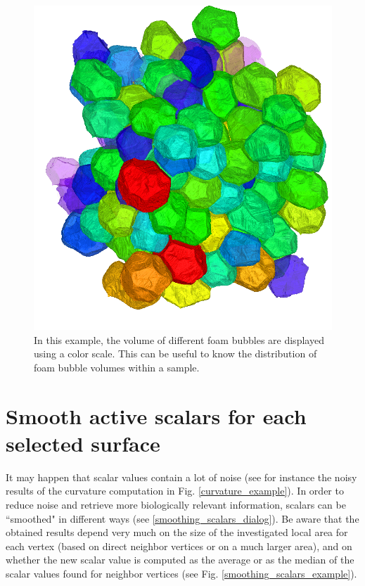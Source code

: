 \begin{figure}
  \centering
  \includegraphics[scale=0.38]{images/11/foam_volume.png} 
	\caption{In this example, the volume of different foam bubbles are displayed using a color scale. This can be useful to know the distribution of foam bubble volumes within a sample.}
\label{foam_volume_example}
\end{figure}



\section{Smooth active scalars for each selected surface}
It may happen that scalar values contain a lot of noise (see for instance the noisy results of the curvature computation in Fig. \ref{curvature_example}). In order to reduce noise and retrieve more biologically relevant information, scalars can be ``smoothed" in different ways (see \ref{smoothing_scalars_dialog}). Be aware that the obtained results depend very much on the size of the investigated local area for each vertex (based on direct neighbor vertices or on a much larger area), and on whether the new scalar value is computed as the average or as the median of the scalar values found for neighbor vertices (see Fig. \ref{smoothing_scalars_example}).


